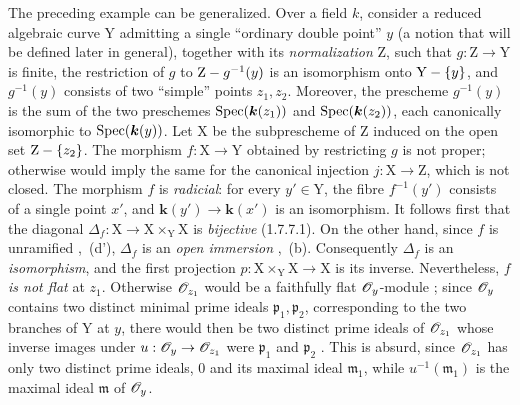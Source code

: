 \begin{env}[11.7.3]
\label{IV.11.7.3}
The preceding example can be generalized. Over a field $k$, consider a reduced algebraic curve $\mathrm{Y}$ admitting a single ``ordinary double point'' $y$ (a notion that will be defined later in general), together with its \emph{normalization} $\mathrm{Z}$, such that $g:\mathrm{Z}\to\mathrm{Y}$ is finite, the restriction of $g$ to $\mathrm{Z}- g^{-1}(y)$ is an isomorphism onto $\mathrm{Y}-\{y\}$, and $g^{-1}(y)$ consists of two ``simple'' points $z_1,z_2$. Moreover, the prescheme $g^{-1}(y)$ is the sum of the two preschemes $\operatorname{Spec}(\boldsymbol{k}(z_1))$ and $\operatorname{Spec}(\boldsymbol{k}(z_2))$, each canonically isomorphic to $\operatorname{Spec}(\boldsymbol{k}(y))$.
Let $\mathrm{X}$ be the subprescheme of $\mathrm{Z}$ induced on the open set $\mathrm{Z}-\{z_2\}$. The morphism $f:\mathrm{X}\to\mathrm{Y}$ obtained by restricting $g$ is not proper; otherwise  would imply the same for the canonical injection $j:\mathrm{X}\to\mathrm{Z}$, which is not closed.
The morphism $f$ is \emph{radicial}: for every $y'\in\mathrm{Y}$, the fibre $f^{-1}(y')$ consists of a single point $x'$, and $\boldsymbol{k}(y')\to\boldsymbol{k}(x')$ is an isomorphism. It follows first that the diagonal $\Delta_f:\mathrm{X}\to\mathrm{X}\times_\mathrm{Y}\mathrm{X}$ is \emph{bijective} (1.7.7.1). On the other hand, since $f$ is unramified ,~(d'), $\Delta_f$ is an \emph{open immersion} ,~(b). Consequently $\Delta_f$ is an \emph{isomorphism}, and the first projection $p:\mathrm{X}\times_\mathrm{Y}\mathrm{X}\to\mathrm{X}$ is its inverse.
Nevertheless, $f$ \emph{is not flat} at $z_1$. Otherwise $\mathscr{O}_{z_1}$ would be a faithfully flat $\mathscr{O}_y$-module ; since $\mathscr{O}_y$ contains two distinct minimal prime ideals $\mathfrak{p}_1,\mathfrak{p}_2$, corresponding to the two branches of $\mathrm{Y}$ at $y$, there would then be two distinct prime ideals of $\mathscr{O}_{z_1}$ whose inverse images under $u:\mathscr{O}_y\to\mathscr{O}_{z_1}$ were $\mathfrak{p}_1$ and $\mathfrak{p}_2$ . This is absurd, since $\mathscr{O}_{z_1}$ has only two distinct prime ideals, $0$ and its maximal ideal $\mathfrak{m}_1$, while $u^{-1}(\mathfrak{m}_1)$ is the maximal ideal $\mathfrak{m}$ of $\mathscr{O}_y$.
\end{env}

